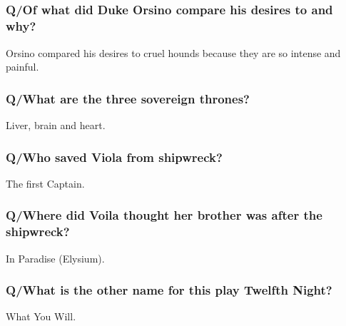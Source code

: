 \documentclass[12pt, a4paper]{article}
\begin{document}
\subsection*{}\bigbreak

\subsubsection*{Q/Of what did Duke Orsino compare his desires to and why?}
Orsino compared his desires to cruel hounds because they are so intense 
and painful.

\subsubsection*{Q/What are the three sovereign thrones?}

Liver, brain and heart.

\subsubsection*{Q/Who saved Viola from shipwreck?}

The first Captain.

\subsubsection*{Q/Where did Voila thought her brother was after the shipwreck?}

In Paradise (Elysium).

\subsubsection*{Q/What is the other name for this play Twelfth Night?}

What You Will.
\end{document}
